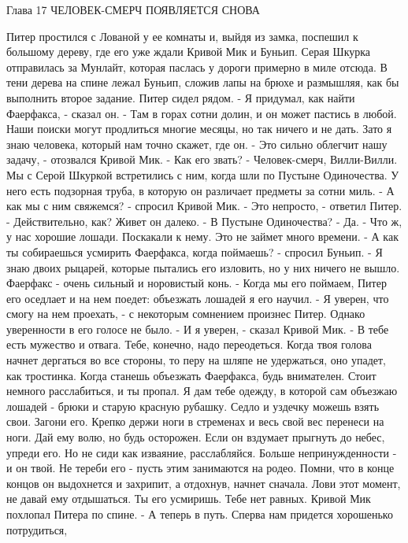         Глава 17
        ЧЕЛОВЕК-СМЕРЧ ПОЯВЛЯЕТСЯ СНОВА

    Питер простился с Лованой у ее комнаты и, выйдя из замка, поспешил 
к большому дереву, где его уже ждали Кривой Мик и Буньип. Серая Шкурка 
отправилась за Мунлайт, которая паслась у дороги примерно в миле 
отсюда.
    В тени дерева на спине лежал Буньип, сложив лапы на брюхе и 
размышляя, как бы выполнить второе задание.
    Питер сидел рядом.
    - Я придумал, как найти Фаерфакса, - сказал он. - Там в горах 
сотни долин, и он может пастись в любой. Наши поиски могут продлиться 
многие месяцы, но так ничего и не дать. Зато я знаю человека, который 
нам точно скажет, где он.
    - Это сильно облегчит нашу задачу, - отозвался Кривой Мик. - Как 
его звать?
    - Человек-смерч, Вилли-Вилли. Мы с Серой Шкуркой встретились с 
ним, когда шли по Пустыне Одиночества. У него есть подзорная труба, в 
которую он различает предметы за сотни миль.
    - А как мы с ним свяжемся? - спросил Кривой Мик.
    - Это непросто, - ответил Питер. - Действительно, как? Живет он 
далеко.
    - В Пустыне Одиночества?
    - Да.
    - Что ж, у нас хорошие лошади. Поскакали к нему. Это не займет 
много времени.
    - А как ты собираешься усмирить Фаерфакса, когда поймаешь? - 
спросил Буньип. - Я знаю двоих рыцарей, которые пытались его изловить, 
но у них ничего не вышло. Фаерфакс - очень сильный и норовистый конь.
    - Когда мы его поймаем, Питер его оседлает и на нем поедет: 
объезжать лошадей я его научил.
    - Я уверен, что смогу на нем проехать, - с некоторым сомнением 
произнес Питер. Однако уверенности в его голосе не было.
    - И я уверен, - сказал Кривой Мик. - В тебе есть мужество и 
отвага. Тебе, конечно, надо переодеться. Когда твоя голова начнет 
дергаться во все стороны, то перу на шляпе не удержаться, оно упадет, 
как тростинка. Когда станешь объезжать Фаерфакса, будь внимателен. 
Стоит немного расслабиться, и ты пропал. Я дам тебе одежду, в которой 
сам объезжаю лошадей - брюки и старую красную рубашку. Седло и уздечку 
можешь взять свои. Загони его. Крепко держи ноги в стременах и весь 
свой вес перенеси на ноги. Дай ему волю, но будь осторожен. Если он 
вздумает прыгнуть до небес, упреди его. Но не сиди как изваяние, 
расслабляйся. Больше непринужденности - и он твой. Не тереби его - 
пусть этим занимаются на родео. Помни, что в конце концов он 
выдохнется и захрипит, а отдохнув, начнет сначала. Лови этот момент, 
не давай ему отдышаться. Ты его усмиришь. Тебе нет равных.
    Кривой Мик похлопал Питера по спине.
    - А теперь в путь. Сперва нам придется хорошенько потрудиться, 
